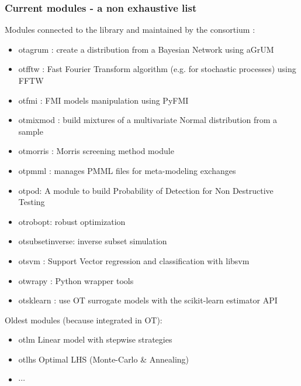 \documentclass[8pt]{beamer}
\begin{document}
\begin{frame}[containsverbatim]
  \frametitle{Current modules - a non exhaustive list}
  
  \alert{Modules} connected to the library and maintained by the consortium :
  \begin{itemize}
  \item \alert{otagrum} : create a distribution from a Bayesian Network using aGrUM
  \item \alert{otfftw} : Fast Fourier Transform algorithm (e.g. for stochastic processes) using FFTW
  \item \alert{otfmi} : FMI models manipulation using PyFMI
  \item \alert{otmixmod} : build mixtures of a multivariate Normal distribution from a sample
  \item \alert{otmorris} : Morris screening method module
  \item \alert{otpmml} : manages PMML files for meta-modeling exchanges
  \item \alert{otpod}: A module to build Probability of Detection for Non Destructive Testing
  \item \alert{otrobopt}: robust optimization
  \item \alert{otsubsetinverse}: inverse subset simulation
  \item \alert{otsvm} : Support Vector regression and classification with libsvm
  \item \alert{otwrapy} : Python wrapper tools
  \item \alert{otsklearn} : use OT surrogate models with the scikit-learn estimator API
  \end{itemize}
  
  Oldest modules (because integrated in OT):
  \begin{itemize}
  \item \alert{otlm} Linear model with stepwise strategies
  \item \alert{otlhs} Optimal LHS (Monte-Carlo \& Annealing)
  \item $\cdots$
  \end{itemize}
  \end{frame}
  
\end{document}
